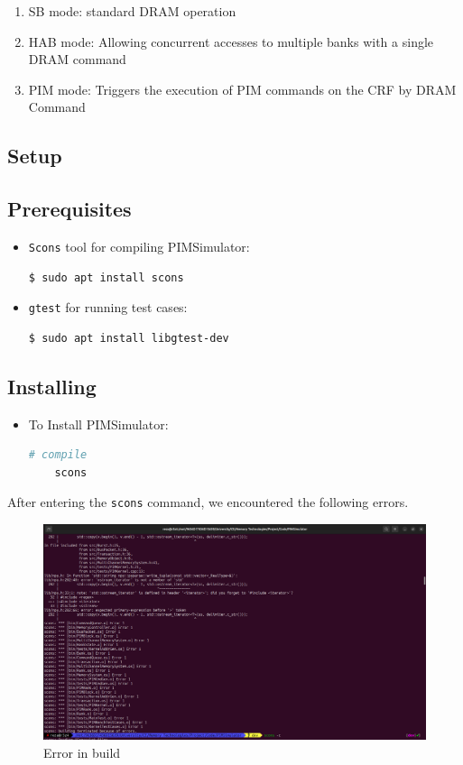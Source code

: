 \documentclass[12pt]{article}
\begin{document}
\begin{enumerate}
	\item SB mode: standard DRAM operation
	\item HAB mode: Allowing concurrent accesses to multiple banks with a single DRAM command
	\item PIM mode: Triggers the execution of PIM commands on the CRF by DRAM Command
\end{enumerate}





\subsection{Setup}
\subsection{Prerequisites}
\begin{itemize}
\item \texttt{Scons} tool for compiling PIMSimulator:
\begin{lstlisting}[language=bash]
	$ sudo apt install scons
\end{lstlisting}

\item \texttt{gtest} for running test cases:
\begin{lstlisting}[language=bash]
	$ sudo apt install libgtest-dev
\end{lstlisting}
\end{itemize}



\subsection{Installing}
\begin{itemize}
\item To Install PIMSimulator:
\begin{lstlisting}[language=bash]
	# compile
	scons
\end{lstlisting}
\end{itemize}



After entering the \texttt{scons} command, we encountered the following errors.
\begin{figure}[h]
	\centering
	\includegraphics[width=1\textwidth]{Images/img4.png}
	\caption{Error in build}
	\label{fig:Error in build}
\end{figure}
\end{document}

